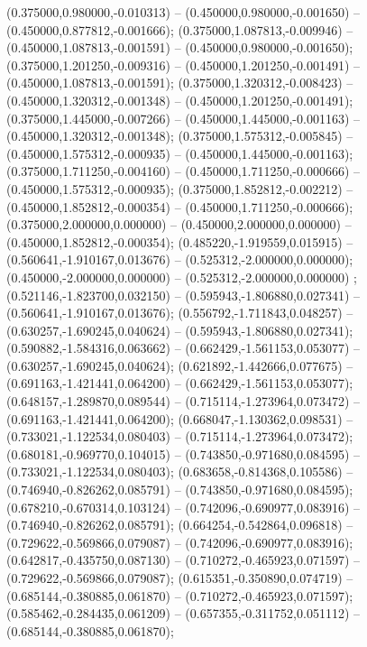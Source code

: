  (0.375000,0.980000,-0.010313) -- (0.450000,0.980000,-0.001650) -- (0.450000,0.877812,-0.001666);
 (0.375000,1.087813,-0.009946) -- (0.450000,1.087813,-0.001591) -- (0.450000,0.980000,-0.001650);
 (0.375000,1.201250,-0.009316) -- (0.450000,1.201250,-0.001491) -- (0.450000,1.087813,-0.001591);
 (0.375000,1.320312,-0.008423) -- (0.450000,1.320312,-0.001348) -- (0.450000,1.201250,-0.001491);
 (0.375000,1.445000,-0.007266) -- (0.450000,1.445000,-0.001163) -- (0.450000,1.320312,-0.001348);
 (0.375000,1.575312,-0.005845) -- (0.450000,1.575312,-0.000935) -- (0.450000,1.445000,-0.001163);
 (0.375000,1.711250,-0.004160) -- (0.450000,1.711250,-0.000666) -- (0.450000,1.575312,-0.000935);
 (0.375000,1.852812,-0.002212) -- (0.450000,1.852812,-0.000354) -- (0.450000,1.711250,-0.000666);
 (0.375000,2.000000,0.000000) -- (0.450000,2.000000,0.000000) -- (0.450000,1.852812,-0.000354);
 (0.485220,-1.919559,0.015915) -- (0.560641,-1.910167,0.013676) -- (0.525312,-2.000000,0.000000);
 (0.450000,-2.000000,0.000000) -- (0.525312,-2.000000,0.000000) ;
 (0.521146,-1.823700,0.032150) -- (0.595943,-1.806880,0.027341) -- (0.560641,-1.910167,0.013676);
 (0.556792,-1.711843,0.048257) -- (0.630257,-1.690245,0.040624) -- (0.595943,-1.806880,0.027341);
 (0.590882,-1.584316,0.063662) -- (0.662429,-1.561153,0.053077) -- (0.630257,-1.690245,0.040624);
 (0.621892,-1.442666,0.077675) -- (0.691163,-1.421441,0.064200) -- (0.662429,-1.561153,0.053077);
 (0.648157,-1.289870,0.089544) -- (0.715114,-1.273964,0.073472) -- (0.691163,-1.421441,0.064200);
 (0.668047,-1.130362,0.098531) -- (0.733021,-1.122534,0.080403) -- (0.715114,-1.273964,0.073472);
 (0.680181,-0.969770,0.104015) -- (0.743850,-0.971680,0.084595) -- (0.733021,-1.122534,0.080403);
 (0.683658,-0.814368,0.105586) -- (0.746940,-0.826262,0.085791) -- (0.743850,-0.971680,0.084595);
 (0.678210,-0.670314,0.103124) -- (0.742096,-0.690977,0.083916) -- (0.746940,-0.826262,0.085791);
 (0.664254,-0.542864,0.096818) -- (0.729622,-0.569866,0.079087) -- (0.742096,-0.690977,0.083916);
 (0.642817,-0.435750,0.087130) -- (0.710272,-0.465923,0.071597) -- (0.729622,-0.569866,0.079087);
 (0.615351,-0.350890,0.074719) -- (0.685144,-0.380885,0.061870) -- (0.710272,-0.465923,0.071597);
 (0.585462,-0.284435,0.061209) -- (0.657355,-0.311752,0.051112) -- (0.685144,-0.380885,0.061870);
